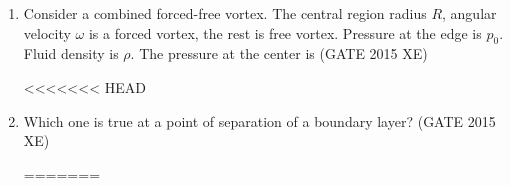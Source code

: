 \documentclass[journal,12pt,onecolumn]{IEEEtran}
\begin{document}
\begin{enumerate}
\begin{enumerate}
\begin{enumerate}[label=\arabic*)]
\item Consider a combined forced-free vortex. The central region radius $R$, angular velocity $\omega$ is a forced vortex, the rest is free vortex. Pressure at the edge is $p_0$. Fluid density is $\rho$. The pressure at the center is  
\hfill{(GATE 2015 XE)} \\
\begin{multicols}{2}
<<<<<<< HEAD
\end{multicols}

\item Which one is true at a point of separation of a boundary layer?  
\hfill{(GATE 2015 XE)} \\
\begin{multicols}{2}
\begin{enumerate}
=======
\vspace{0.5cm}


\end{enumerate}
\end{multicols}
\end{enumerate}
\end{enumerate}
\end{enumerate}
\end{document}
